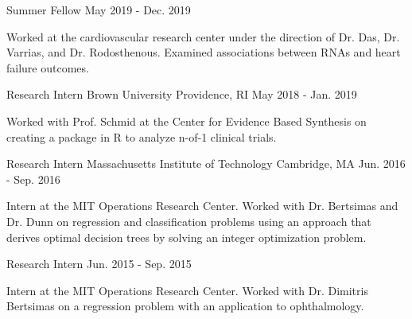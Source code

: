 \begin{cventries}
\vspace{-1mm}
  \cventry
    {Summer Fellow} %
    {} %
    {} %
    {May 2019 - Dec. 2019} %
    {
      \begin{cvitems} %
        \item {Worked at the cardiovascular research center under the direction of Dr. Das, Dr. Varrias, and Dr. Rodosthenous. Examined associations between RNAs and heart failure outcomes.}
      \end{cvitems}
    }

\vspace{-1mm}
  \cventry
    {Research Intern} %
    {Brown University} %
    {Providence, RI} %
    {May 2018 - Jan. 2019} %
    {
      \begin{cvitems} %
        \item {Worked with Prof. Schmid at the Center for Evidence Based Synthesis on creating a package in R to analyze n-of-1 clinical trials.}
      \end{cvitems}
    }

\vspace{-1mm}
  \cventry
    {Research Intern} %
    {Massachusetts Institute of Technology} %
    {Cambridge, MA} %
    {Jun. 2016 - Sep. 2016} %
    {
      \begin{cvitems} %
        \item {Intern at the MIT Operations Research Center. Worked with Dr. Bertsimas and Dr. Dunn on regression and classification problems using an approach that derives optimal decision trees by solving an integer optimization problem.}
      \end{cvitems}
    }

\vspace{-1mm}
  \cventry
    {Research Intern} %
    {} %
    {} %
    {Jun. 2015 - Sep. 2015} %
    {
      \begin{cvitems} %
        \item {Intern at the MIT Operations Research Center. Worked with Dr. Dimitris Bertsimas on a regression problem with an application to ophthalmology.}
      \end{cvitems}
    }

\end{cventries}
